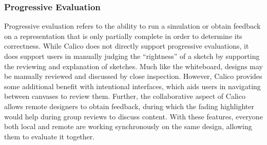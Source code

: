 \documentclass[12pt,fleqn]{ucithesis}
\begin{document}


\subsubsection{Progressive Evaluation}
Progressive evaluation refers to the ability to run a simulation or obtain feedback on a representation that is only partially complete in order to determine its correctness. While Calico does not directly support progressive evaluations, it does support users in manually judging the ``rightness'' of a sketch by supporting the reviewing and explanation of sketches. Much like the whiteboard, designs may be manually reviewed and discussed by close inspection. However, Calico provides some additional benefit with intentional interfaces, which aids users in navigating between canvases to review them. Further, the collaborative aspect of Calico allows remote designers to obtain feedback, during which the fading highlighter would help during group reviews to discuss content. With these features, everyone both local and remote are working synchronously on the same design, allowing them to evaluate it together.


\end{document}
